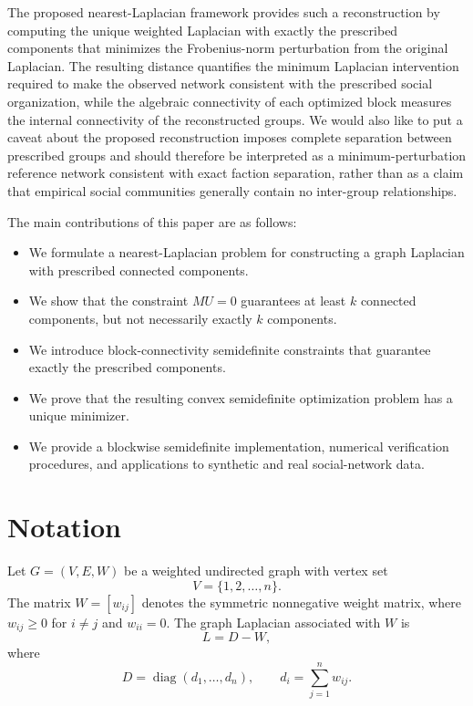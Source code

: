 \documentclass[11pt]{article}
\begin{document}
    The proposed nearest-Laplacian framework provides such a reconstruction by computing the unique weighted Laplacian with exactly the prescribed components that minimizes the Frobenius-norm perturbation from the original Laplacian. The resulting distance quantifies the minimum Laplacian intervention required to make the observed network consistent with the prescribed social organization, while the algebraic connectivity of each optimized block measures the internal connectivity of the reconstructed groups. We would also like to put a caveat about the proposed reconstruction imposes complete separation between prescribed groups and should therefore be interpreted as a minimum-perturbation reference network consistent with exact faction separation, rather than as a claim that empirical social communities generally contain no inter-group relationships.
	
	The main contributions of this paper are as follows:
	\begin{itemize}
		\item We formulate a nearest-Laplacian problem for constructing a graph Laplacian with prescribed connected components.
		\item We show that the constraint $MU=0$ guarantees at least $k$ connected components, but not necessarily exactly $k$ components.
		\item We introduce block-connectivity semidefinite constraints that guarantee exactly the prescribed components.
		\item We prove that the resulting convex semidefinite optimization problem has a unique minimizer.
		\item We provide a blockwise semidefinite implementation, numerical verification procedures, and applications to synthetic and real social-network data.
	\end{itemize}
	
\section{Notation}

Let $G=(V,E,W)$ be a weighted undirected graph with vertex set
\[
V=\{1,2,\ldots,n\}.
\]
The matrix $W=[w_{ij}]$ denotes the symmetric nonnegative weight matrix, where $w_{ij}\ge 0$ for $i\ne j$ and $w_{ii}=0$. The graph Laplacian associated with $W$ is
\[
L=D-W,
\]
where
\[
D=\operatorname{diag}(d_1,\ldots,d_n),
\qquad
d_i=\sum_{j=1}^{n}w_{ij}.
\]
\end{document}
